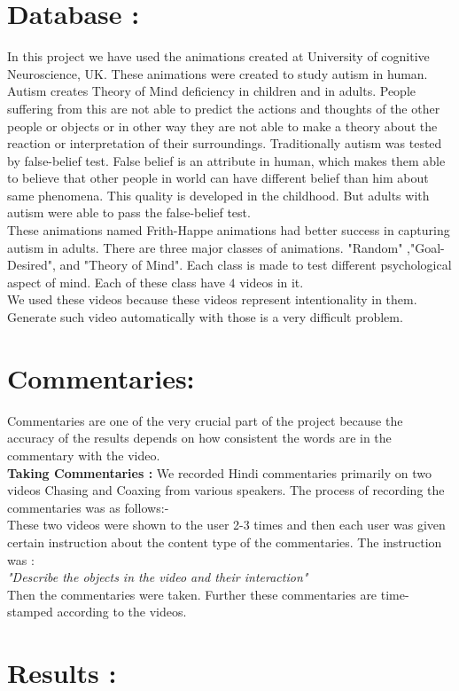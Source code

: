 \documentclass[10pt, twocolumn]{article}
\begin{document}
\section*{Database :}
In this project we have used the animations\cite{fhanimation} created at University of cognitive Neuroscience, UK. These animations were created to study autism in human. Autism creates Theory of Mind deficiency in children and in adults. People suffering from this are not able to predict the actions and thoughts of the other people or objects or in other way they are not able to make a theory about the reaction or interpretation of their surroundings. Traditionally autism was tested by false-belief test. False belief is an attribute in human, which makes them able to believe that other people in world can have different belief than him about same phenomena. This quality is developed in the childhood. But adults with autism were able to pass the false-belief test.\\
\hspace*{10pt} These animations named Frith-Happe animations had better success in capturing autism in adults. There are three major classes of animations. "Random" ,"Goal-Desired", and "Theory of Mind". Each class is made to test different psychological aspect of mind. Each of these class have $4$ videos in it.\\


We used these videos because these videos represent intentionality in them. Generate such video automatically with those is a very difficult problem.
\section*{Commentaries: } Commentaries are one of the very crucial part of the project because the accuracy of the results depends on how consistent the words are in the commentary with the video.\\ 
{\bf Taking Commentaries  : } We recorded Hindi commentaries primarily on two videos Chasing and Coaxing from various speakers. The process of recording the commentaries was as follows:-\\
\hspace*{10pt} These two videos were shown to the user 2-3 times and then each user was given certain instruction about the content type of the commentaries. The instruction was :
\\
{\it "Describe the objects in the video and their interaction" }\\
Then the commentaries were taken. Further these commentaries are time-stamped according to the videos.
\section*{Results :} 


\end{document}
